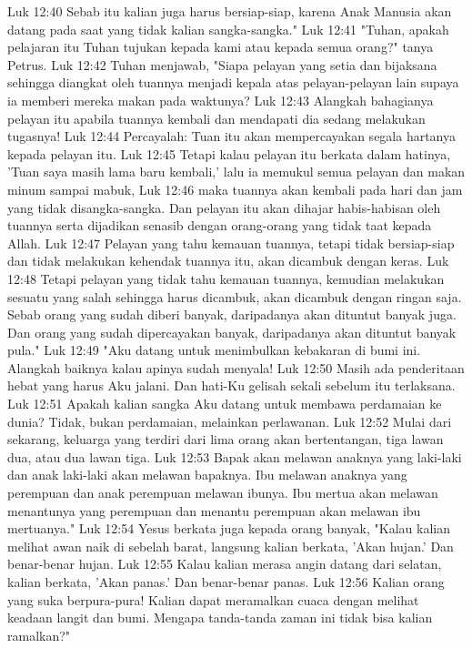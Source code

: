 Luk 12:40  Sebab itu kalian juga harus bersiap-siap, karena Anak Manusia akan datang pada saat yang tidak kalian sangka-sangka."
Luk 12:41  "Tuhan, apakah pelajaran itu Tuhan tujukan kepada kami atau kepada semua orang?" tanya Petrus.
Luk 12:42  Tuhan menjawab, "Siapa pelayan yang setia dan bijaksana sehingga diangkat oleh tuannya menjadi kepala atas pelayan-pelayan lain supaya ia memberi mereka makan pada waktunya?
Luk 12:43  Alangkah bahagianya pelayan itu apabila tuannya kembali dan mendapati dia sedang melakukan tugasnya!
Luk 12:44  Percayalah: Tuan itu akan mempercayakan segala hartanya kepada pelayan itu.
Luk 12:45  Tetapi kalau pelayan itu berkata dalam hatinya, 'Tuan saya masih lama baru kembali,' lalu ia memukul semua pelayan dan makan minum sampai mabuk,
Luk 12:46  maka tuannya akan kembali pada hari dan jam yang tidak disangka-sangka. Dan pelayan itu akan dihajar habis-habisan oleh tuannya serta dijadikan senasib dengan orang-orang yang tidak taat kepada Allah.
Luk 12:47  Pelayan yang tahu kemauan tuannya, tetapi tidak bersiap-siap dan tidak melakukan kehendak tuannya itu, akan dicambuk dengan keras.
Luk 12:48  Tetapi pelayan yang tidak tahu kemauan tuannya, kemudian melakukan sesuatu yang salah sehingga harus dicambuk, akan dicambuk dengan ringan saja. Sebab orang yang sudah diberi banyak, daripadanya akan dituntut banyak juga. Dan orang yang sudah dipercayakan banyak, daripadanya akan dituntut banyak pula."
Luk 12:49  "Aku datang untuk menimbulkan kebakaran di bumi ini. Alangkah baiknya kalau apinya sudah menyala!
Luk 12:50  Masih ada penderitaan hebat yang harus Aku jalani. Dan hati-Ku gelisah sekali sebelum itu terlaksana.
Luk 12:51  Apakah kalian sangka Aku datang untuk membawa perdamaian ke dunia? Tidak, bukan perdamaian, melainkan perlawanan.
Luk 12:52  Mulai dari sekarang, keluarga yang terdiri dari lima orang akan bertentangan, tiga lawan dua, atau dua lawan tiga.
Luk 12:53  Bapak akan melawan anaknya yang laki-laki dan anak laki-laki akan melawan bapaknya. Ibu melawan anaknya yang perempuan dan anak perempuan melawan ibunya. Ibu mertua akan melawan menantunya yang perempuan dan menantu perempuan akan melawan ibu mertuanya."
Luk 12:54  Yesus berkata juga kepada orang banyak, "Kalau kalian melihat awan naik di sebelah barat, langsung kalian berkata, 'Akan hujan.' Dan benar-benar hujan.
Luk 12:55  Kalau kalian merasa angin datang dari selatan, kalian berkata, 'Akan panas.' Dan benar-benar panas.
Luk 12:56  Kalian orang yang suka berpura-pura! Kalian dapat meramalkan cuaca dengan melihat keadaan langit dan bumi. Mengapa tanda-tanda zaman ini tidak bisa kalian ramalkan?"

